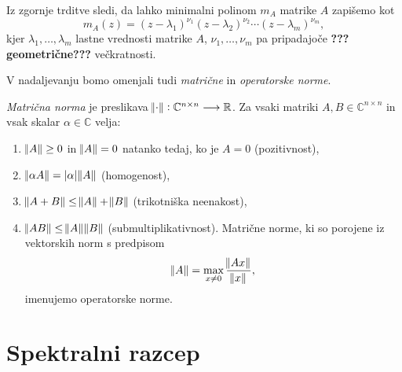 \documentclass[mat1]{fmfdelo}
\newcommand{\R}{\mathbb R}
\newcommand{\C}{\mathbb C}
\begin{document}
Iz zgornje trditve sledi, da lahko minimalni polinom $m_A$ matrike $A$ zapišemo kot
\begin{equation}
    m_A(z) = (z-\lambda_1)^{\nu_1}(z-\lambda_2)^{\nu_2}\cdots (z-\lambda_m)^{\nu_m},
\end{equation}
kjer $\lambda_1, \ldots, \lambda_m$ lastne vrednosti matrike $A$, $\nu_1, \ldots, \nu_m$ pa pripadajoče \textbf{???geometrične???} večkratnosti.

V nadaljevanju bomo omenjali tudi \emph{matrične} in \emph{operatorske norme}.
\begin{definicija}
    \emph{Matrična norma} je preslikava $\norm{\cdot}: \C^{n \times n} \longrightarrow \R$. Za vsaki matriki $A, B \in \C^{n \times n}$ in vsak skalar $\alpha \in \C$ velja:
    \begin{enumerate}
        \item $\norm{A} \geq 0$ in $\norm{A} = 0$ natanko tedaj, ko je $A = 0$ (pozitivnost),
        \item $\norm{\alpha A} = |\alpha|\norm{A}$ (homogenost),
        \item $\norm{A + B} \leq \norm{A} + \norm{B}$ (trikotniška neenakost), 
        \item $\norm{A B} \leq \norm{A} \norm{B}$ (submultiplikativnost). Matrične norme, ki so porojene iz vektorskih norm s predpisom
        \begin{equation}
            \norm{A} = \max_{x \neq 0} \frac{\norm{A x}}{\norm{x}},
        \end{equation}
        imenujemo operatorske norme.
    \end{enumerate} 
\end{definicija}

\section{Spektralni razcep}
\end{document}
